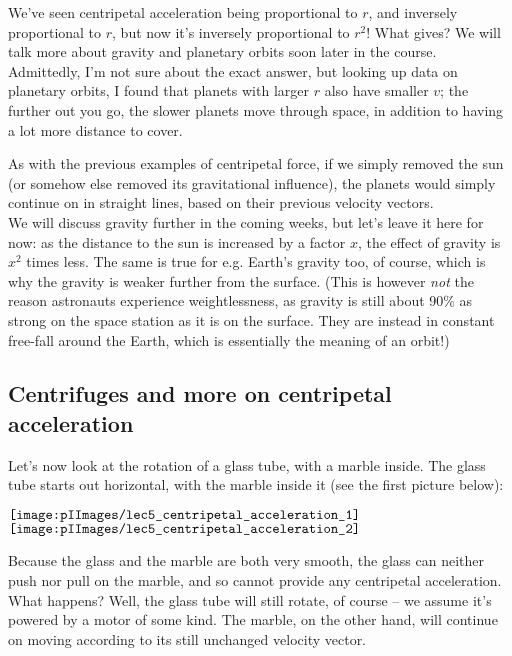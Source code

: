 We've seen centripetal acceleration being proportional to $r$, and inversely proportional to $r$, but now it's inversely proportional to $r^2$! What gives? We will talk more about gravity and planetary orbits soon later in the course. Admittedly, I'm not sure about the exact answer, but looking up data on planetary orbits, I found that planets with larger $r$ also have smaller $v$; the further out you go, the slower planets move through space, in addition to having a lot more distance to cover.

As with the previous examples of centripetal force, if we simply removed the sun (or somehow else removed its gravitational influence), the planets would simply continue on in straight lines, based on their previous velocity vectors.\\
We will discuss gravity further in the coming weeks, but let's leave it here for now: as the distance to the sun is increased by a factor $x$, the effect of gravity is $x^2$ times less. The same is true for e.g. Earth's gravity too, of course, which is why the gravity is weaker further from the surface. (This is however \emph{not} the reason astronauts experience weightlessness, as gravity is still about 90\% as strong on the space station as it is on the surface. They are instead in constant free-fall around the Earth, which is essentially the meaning of an orbit!)

\subsection{Centrifuges and more on centripetal acceleration}

Let's now look at the rotation of a glass tube, with a marble inside. The glass tube starts out horizontal, with the marble inside it (see the first picture below):

\begin{center}
$\vcenter{\hbox{\texttt{[image: \\pIImages/lec5\_centripetal\_acceleration\_1]}}}$
$\vcenter{\hbox{\texttt{[image: \\pIImages/lec5\_centripetal\_acceleration\_2]}}}$
\end{center}

Because the glass and the marble are both very smooth, the glass can neither push nor pull on the marble, and so cannot provide any centripetal acceleration. What happens? Well, the glass tube will still rotate, of course -- we assume it's powered by a motor of some kind. The marble, on the other hand, will continue on moving according to its still unchanged velocity vector.

